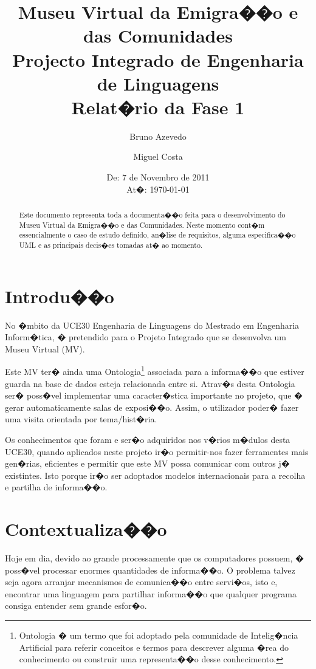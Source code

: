 \documentclass[a4paper,titlepage]{article}
\title{\textbf{Museu Virtual da Emigra��o e das Comunidades}\\Projecto Integrado de Engenharia de Linguagens \\ Relat�rio da Fase 1}
\author{Bruno Azevedo}
\author{Miguel Costa}
\affil{ Mestrado em Engenharia Inform�tica,\\ Departamento de Inform�tica,\\Universidade do Minho}
\date{De: 7 de Novembro de 2011 \\ At�: \today}
\begin{document}
\begin{titlepage}
	\maketitle

	\begin{abstract}
	Este documento representa toda a documenta��o feita para o desenvolvimento do Museu Virtual da Emigra��o e das Comunidades. Neste momento cont�m essencialmente o caso de estudo definido, an�lise de requisitos, alguma especifica��o UML e as principais decis�es tomadas at� ao momento.
	\end{abstract}

\end{titlepage}

\newpage

\parskip=0mm
\tableofcontents
\parskip=2mm

\newpage

\section{Introdu��o}
No �mbito da UCE30 Engenharia de Linguagens do Mestrado em Engenharia Inform�tica, � pretendido para o Projeto Integrado que se desenvolva um Museu Virtual (MV).

Este MV ter� ainda uma Ontologia\footnote{Ontologia � um termo que foi adoptado pela comunidade de Intelig�ncia Artificial para referir conceitos e termos para descrever alguma �rea do conhecimento ou construir uma representa��o desse conhecimento.} associada para a informa��o que estiver guarda na base de dados esteja relacionada entre si. Atrav�s desta Ontologia ser� poss�vel implementar uma caracter�stica importante no projeto, que � gerar automaticamente salas de exposi��o. Assim, o utilizador poder� fazer uma visita orientada por tema/hist�ria.

	Os conhecimentos que foram e ser�o adquiridos nos v�rios m�dulos desta UCE30, quando aplicados neste projeto ir�o permitir-nos fazer ferramentes mais gen�rias, eficientes e permitir que este MV possa comunicar com outros j� existintes. Isto porque ir�o ser adoptados modelos internacionais para a recolha e partilha de informa��o.



\newpage

\section{Contextualiza��o}
	Hoje em dia, devido ao grande processamente que os computadores possuem, � poss�vel processar enormes quantidades de informa��o. O problema talvez seja agora arranjar mecanismos de comunica��o entre servi�os, isto e, encontrar uma linguagem para partilhar informa��o que qualquer programa consiga entender sem grande esfor�o.
	
\end{document}
